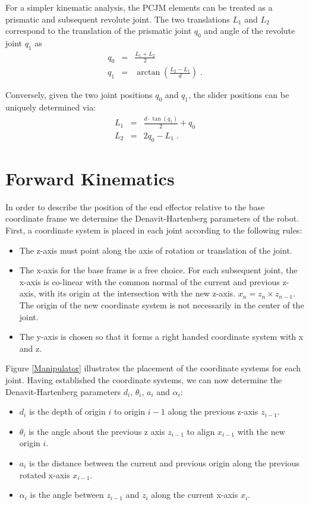 For a simpler kinematic analysis, the PCJM elements can be treated as a prismatic and subsequent revolute joint.
The two translations $L_1$ and $L_2$ correspond to the translation of the prismatic joint $q_0$ and angle of the revolute joint $q_1$ as
\begin{eqnarray}
	q_0	&=&	\frac{L_1+L_2}{2} \\
	q_1	&=&	\arctan(\frac{L_2-L_1}{d})\;.
\end{eqnarray}

Conversely, given the two joint positions $q_0$ and $q_1$, the slider positions can be uniquely determined via: 
\begin{eqnarray}
	L_1	&=&	\frac{d\cdot \tan(q_1)}{2}+q_0 \\
	L_2	&=& 2 q_0-L_1\;.
\end{eqnarray}


\section{Forward Kinematics}\label{FK}

In order to describe the position of the end effector relative to the base coordinate frame we determine the Denavit-Hartenberg parameters \cite{hartenberg} of the robot. First, a coordinate system is placed in each joint according to the following rules:
\begin{itemize}
	\item The z-axis must point along the axis of rotation or translation of the joint.
	\item The x-axis for the base frame is a free choice. For each subsequent joint, the x-axis is co-linear with the common normal of the current and previous z-axis, with its origin at the intersection with the new z-axis.  $x_n=z_n\times z_{n-1}$. The origin of the new coordinate system is not necessarily in the center of the joint.
	\item The y-axis is chosen so that it forms a right handed coordinate system with x and z.
\end{itemize}
Figure \ref{Manipulator} illustrates the placement of the coordinate systems for each joint. 
Having established the coordinate systems, we can now determine the Denavit-Hartenberg parameters $d_i$, $\theta_i$, $a_i$ and $\alpha_i$:
\begin{itemize}
	\item $d_i$ is the depth of origin $i$ to origin $i-1$ along the previous z-axis $z_{i-1}$. 
	\item $\theta_i$ is the angle about the previous z axis $z_{i-1}$ to align $x_{i-1}$ with the new origin $i$.
	\item $a_i$ is the distance between the current and previous origin along the previous rotated x-axis $x_{i-1}$.
	\item $\alpha_i$ is the angle between $z_{i-1}$ and $z_i$ along the current x-axis $x_i$.
\end{itemize}

